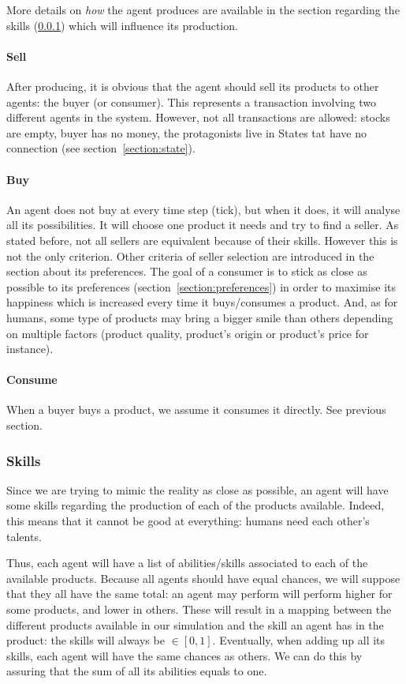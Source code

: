 More details on \emph{how} the agent produces are available in the section regarding the skills (\ref{section:skills}) which will influence its production.

\paragraph{Sell}
After producing, it is obvious that the agent should sell its products to other agents: the buyer (or consumer). This represents a transaction involving two different agents in the system. However, not all transactions are allowed: stocks are empty, buyer has no money, the protagonists live in States tat have no connection (see section~\ref{section:state}).

\paragraph{Buy} 
An agent does not buy at every time step (tick), but when it does, it will analyse all its possibilities. It will choose one product it needs and try to find a seller. As stated before, not all sellers are equivalent because of their skills. However this is not the only criterion. Other criteria of seller selection are introduced in the section about its preferences. The goal of a consumer is to stick as close as possible to its preferences (section~\ref{section:preferences}) in order to maximise its happiness which is increased every time it buys/consumes a product. And, as for humans, some type of products may bring a bigger smile than others depending on multiple factors (product quality, product's origin or product's price for instance).

\paragraph{Consume}
When a buyer buys a product, we assume it consumes it directly. See previous section.

\subsubsection{Skills}\label{section:skills}
Since we are trying to mimic the reality as close as possible, an agent will have some skills regarding the production of each of the products available. Indeed, this means that it cannot be good at everything: humans need each other's talents.

Thus, each agent will have a list of abilities/skills associated to each of the available products. Because all agents should have equal chances, we will suppose that they all have the same total: an agent may perform will perform higher for some products, and lower in others. These will result in a mapping between the different products available in our simulation and the skill an agent has in the product: the skills will always be $\in [0, 1]$. Eventually, when adding up all its skills, each agent will have the same chances as others. We can do this by assuring that the sum of all its abilities equals to one.


